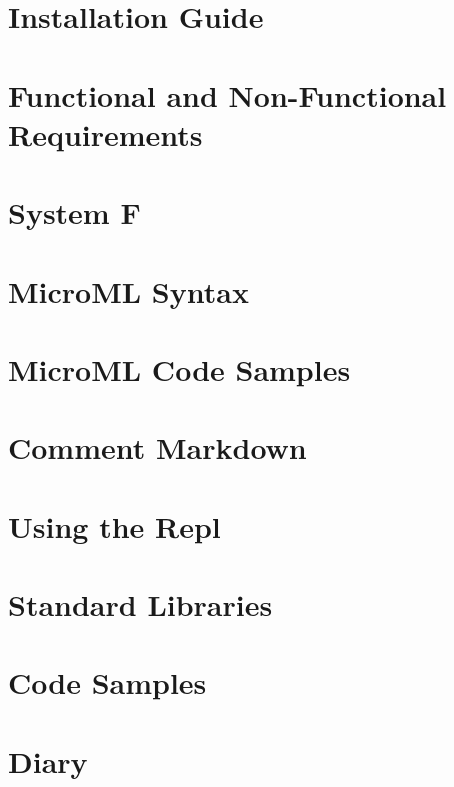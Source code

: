 \documentclass[12pt, a4paper]{report}
\begin{document}
\begin{appendices}
    \chapter{Installation Guide}
    
    \chapter{Functional and Non-Functional Requirements}
    \label{appendix:functionalRequirements}
    
    \chapter{System F}
    \label{appendix:sysf}
    
    \chapter{MicroML Syntax}
    \label{appendix:syntax}
    
    \chapter{MicroML Code Samples}
    \label{appendix:mmlcode}
    
    \chapter{Comment Markdown}
    \label{appendix:md}
    
    \chapter{Using the Repl}
    \label{appendix:repl}
    
    \chapter{Standard Libraries}
    \label{appendix:libs}
    
    \chapter{Code Samples}
    \label{appendix:samples}
    
    \chapter{Diary}
    \label{appendix:diary}
    
\end{appendices}

\nocite{adams2012layout}
\nocite{9780511608865}
\nocite{Wadler:1995:MFP:647698.734146}
\nocite{958}
\nocite{Steele:1994:BIC:174675.178068}
\nocite{opac-b1081362}
\nocite{cardelli1984basic}

{}

\end{document}

